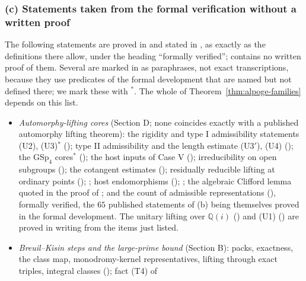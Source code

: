 \documentclass[10pt]{amsart}
\theoremstyle{definition}
\theoremstyle{remark}
\newcommand{\Q}{\mathbb Q}
\begin{document}
\subsubsection*{(c) Statements taken from the formal verification without a written proof}
The following statements are proved in \cite{CharacterFamily} and stated in
\cite{Annex}, as exactly as the definitions there allow, under the heading
``formally verified''; \cite{Annex} contains no written proof of them.
Several are marked in \cite{Annex} as paraphrases, not exact
transcriptions, because they use predicates of the formal development that
are named but not defined there; we mark these with $^\ast$. The whole of
Theorem~\ref{thm:alpoge-families} depends on this list.
\begin{itemize}
\item \emph{Automorphy-lifting cores} (Section D; none coincides exactly
with a published automorphy lifting theorem): the rigidity and type I
admissibility statements (U2), (U3)$^\ast$
(\cite[Proposition~\ref{A-i5:x5-prop-U234}]{Annex}); type II admissibility
and the length estimate (U3$'$), (U4)
(\cite[Proposition~\ref{A-i5:x5-prop-U4}]{Annex}); the $\mathrm{GSp}_4$
cores$^\ast$ (\cite[Proposition~\ref{A-i5:x5-prop-sp4core}]{Annex}); the
host inputs of Case V (\cite[Proposition~\ref{A-i5:x5-prop-Vhost}]{Annex});
irreducibility on open subgroups
(\cite[Lemma~\ref{A-i5:x5-lem-Vopen}]{Annex}); the cotangent estimates
(\cite[Proposition~\ref{A-i5:x5-prop-UM}]{Annex}); residually reducible
lifting at ordinary points (\cite[Proposition~\ref{A-i5:x5-prop-gdend}]{Annex});
\cite[Lemma~\ref{A-i5:x5-lem-U1steps}]{Annex}; host endomorphisms
(\cite[Proposition~\ref{A-i5:x5-prop-hostend}]{Annex});
\cite[Lemma~\ref{A-i5:x5-lem-Vsteps}]{Annex}; the algebraic Clifford lemma
quoted in the proof of \cite[Lemma~\ref{A-i5:x5-lem-irrcyc}]{Annex}; and the
count of admissible representations
(\cite[Proposition~\ref{A-i5:x-prop:u3count}]{Annex}), formally verified,
the $65$ published statements of (b) being themselves proved in the formal
development. The unitary lifting over $\Q(i)$
(\cite[Proposition~\ref{A-i5:x5-prop-Vcore}]{Annex}) and (U1)
(\cite[Proposition~\ref{A-i5:x5-prop-U1}]{Annex}) are proved in writing from
the items just listed.
\item \emph{Breuil--Kisin steps and the large-prime bound} (Section B):
packs, exactness, the class map, monodromy-kernel representatives, lifting
through exact triples, integral classes
(\cite[Propositions~\ref{A-i2:bk-b}, \ref{A-i2:bk-ex}, \ref{A-i2:bk-cl},
\ref{A-i2:bk-mon}, \ref{A-i2:bk-tri}, \ref{A-i2:bk-int}]{Annex}); fact (T4) of

\end{itemize}
\end{document}
